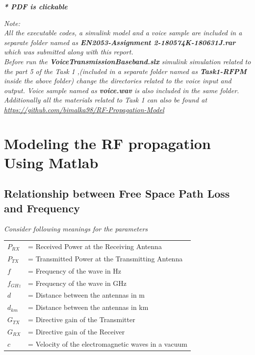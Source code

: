 \documentclass[a4paper,11pt]{article}%
\begin{document}

\tableofcontents

\begin{center}
	\textbf{\textit{* PDF is clickable}}
\end{center}



\textit{Note:}\\

\textit{All the executable codes, a simulink model and a voice sample are included in a separate folder named as \textbf{EN2053-Assignment 2-180574K-180631J.rar} which was submitted along with this report.}\\

\textit{Before run the \textbf{VoiceTransmissionBaseband.slx} simulink simulation related to the part 5 of the Task 1 ,(included in a separate folder named as \textbf{Task1-RFPM} inside the above folder) change the directories related to the voice input and output. Voice sample named as \textbf{voice.wav} is also included in the same folder.}\\

\textit{Additionally all the materials related to Task 1 can also be found at \url{https://github.com/bimalka98/RF-Propagation-Model}}



\pagebreak
\section{Modeling the RF propagation Using Matlab}
\subsection{Relationship between Free Space Path Loss and Frequency}

\textit{Consider  following meanings for the parameters}\\

\begin{tabular}{l l }
	$P_{RX}$ & = Received Power at the Receiving Antenna\\
	$P_{TX}$ & = Transmitted Power at the Transmitting Antenna\\
	$f$ & = Frequency of the wave in Hz\\
	$f_{GHz}$ & = Frequency of the wave in GHz\\
	$d$& = Distance between the antennas in m\\
	$d_{km}$& = Distance between the antennas in km\\
	$G_{TX}$& = Directive gain of the Transmitter\\
	$G_{RX}$& = Directive gain of the Receiver\\
	$c$& = Velocity of the electromagnetic waves in a vacuum\\

\end{tabular}\\[1cm]
\end{document}
